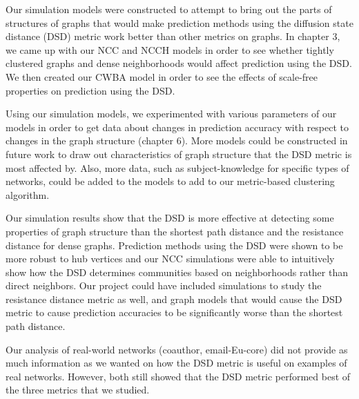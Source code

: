 Our simulation models were constructed to attempt to bring out the parts of 
structures of graphs that would make prediction methods using the diffusion state distance (DSD) metric work better than other metrics on graphs. In chapter 3, we came up with our NCC and NCCH models in order to see whether tightly clustered graphs and dense neighborhoods would affect prediction using the DSD. We then created our CWBA model in order to see the effects of scale-free properties on prediction using the DSD.

Using our simulation models, we experimented with various parameters of our models in order to get data about changes in prediction accuracy with respect to changes in the graph structure (chapter 6). More models could be constructed in future work to draw out characteristics of graph structure that the DSD metric is most affected by. Also, more data, such as subject-knowledge for specific types of networks, could be added to the models to add to our metric-based clustering algorithm.

Our simulation results show that the DSD is more effective at detecting some 
properties of graph structure than the shortest path distance and the
resistance distance for dense graphs. Prediction methods using the DSD were 
shown to be more robust to hub vertices and our NCC simulations were able to
intuitively show how the DSD determines communities based on neighborhoods 
rather than direct neighbors. Our project could have included simulations to
study the resistance distance metric as well, and graph models that would
cause the DSD metric to cause prediction accuracies to be significantly 
worse than the shortest path distance.

Our analysis of real-world networks (coauthor, email-Eu-core) did not provide
as much information as we wanted on how the DSD metric is useful on examples
of real networks. However, both still showed that the DSD metric performed
best of the three metrics that we studied.

